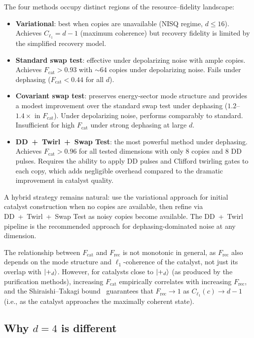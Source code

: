 \documentclass[prx,twocolumn,superscriptaddress,longbibliography,floatfix]{revtex4-2}
\begin{document}
The four methods occupy distinct regions of the resource--fidelity landscape:
\begin{itemize}
\item \textbf{Variational}: best when copies are unavailable (NISQ regime, $d \leq 16$). Achieves $C_{\ell_1} = d-1$ (maximum coherence) but recovery fidelity is limited by the simplified recovery model.
\item \textbf{Standard swap test}: effective under depolarizing noise with ample copies. Achieves $F_\mathrm{cat} > 0.93$ with $\sim\!64$ copies under depolarizing noise. Fails under dephasing ($F_\mathrm{cat} < 0.44$ for all $d$).
\item \textbf{Covariant swap test}: preserves energy-sector mode structure and provides a modest improvement over the standard swap test under dephasing ($1.2$--$1.4\times$ in $F_\mathrm{cat}$). Under depolarizing noise, performs comparably to standard. Insufficient for high $F_\mathrm{cat}$ under strong dephasing at large $d$.
\item \textbf{DD~+~Twirl~+~Swap Test}: the most powerful method under dephasing. Achieves $F_\mathrm{cat} > 0.96$ for all tested dimensions with only 8 copies and 8 DD pulses. Requires the ability to apply DD pulses and Clifford twirling gates to each copy, which adds negligible overhead compared to the dramatic improvement in catalyst quality.
\end{itemize}

A hybrid strategy remains natural: use the variational approach for initial catalyst construction when no copies are available, then refine via DD~+~Twirl~+~Swap Test as noisy copies become available.
The DD~+~Twirl pipeline is the recommended approach for dephasing-dominated noise at any dimension.

The relationship between $F_\mathrm{cat}$ and $F_\mathrm{rec}$ is not monotonic in general, as $F_\mathrm{rec}$ also depends on the mode structure and $\ell_1$-coherence of the catalyst, not just its overlap with $\ket{+_d}$.
However, for catalysts close to $\ket{+_d}$ (as produced by the purification methods), increasing $F_\mathrm{cat}$ empirically correlates with increasing $F_\mathrm{rec}$, and the Shiraishi--Takagi bound~\cite{Shiraishi2024} guarantees that $F_\mathrm{rec} \to 1$ as $C_{\ell_1}(c) \to d - 1$ (i.e., as the catalyst approaches the maximally coherent state).

\subsection{Why $d = 4$ is different}
\label{sec:d4}
\end{document}
